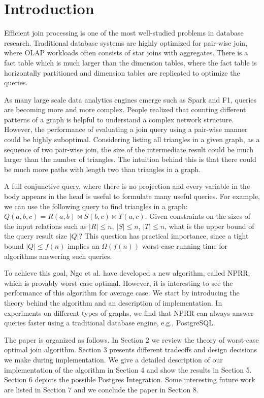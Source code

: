 \section{Introduction}

Efficient join processing is one of the most well-studied problems in database research. Traditional database systems are highly optimized for pair-wise join, where OLAP workloads often consists of star joins with aggregates. There is a fact table which is much larger than the dimension tables, where the fact table is horizontally partitioned and dimension tables are replicated to optimize the queries. 

As many large scale data analytics engines emerge such as Spark and F1, queries are becoming more and more complex. People realized that counting different patterns of a graph is helpful to understand a complex network structure. However, the performance of evaluating a join query using a pair-wise manner could be highly suboptimal. Considering listing all triangles in a given graph, as a sequence of two pair-wise join, the size of the intermediate result could be much larger than the number of triangles. The intuition behind this is that there could be much more paths with length two than triangles in a graph. 


A full conjunctive query, where there is no projection and every variable in the body appears in the head is useful to formulate many useful queries. For example, we can use the following query to find triangles in a graph: $Q(a, b, c) = R(a, b) \Join S(b, c) \Join T(a, c)$. Given constraints on the sizes of the input relations such as $|R| \leq n$, $|S| \leq n$, $|T| \leq n$, what is the upper bound of the  query result size $|Q|$? This question has practical importance, since a tight bound $|Q| \leq f(n)$ implies an $\Omega (f(n))$ worst-case running time for algorithms answering such queries.

To achieve this goal, Ngo et al. have developed a new algorithm, called NPRR, which is provably worst-case optimal. However, it is interesting to see the performance of this algorithm for average case. We start by introducing the theory behind the algorithm and an description of implementation. In experiments on different types of graphs, we find that NPRR can always answer queries faster using a traditional database engine, e.g., PostgreSQL. 
 
 
The paper is organized as follows. In Section 2 we review the theory of worst-case optimal join algorithm. Section 3 presents different tradeoffs and design decisions we make during implementation. We give a detailed description of our implementation of the algorithm in Section 4 and show the results in Section 5. Section 6 depicts the possible Postgres Integration. Some interesting future work are listed in Section 7 and we conclude the paper in Section 8.
